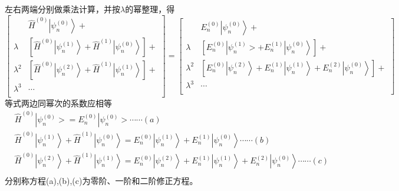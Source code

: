 \begin{frame}
  \frametitle{}
左右两端分别做乘法计算，并按$ \lambda  $的幂整理，得
\[\begin{bmatrix} ~ & \hat{H}^{(0)}\left|\psi_n^{(0)}\right\rangle + \qquad \qquad \qquad \qquad\\ 
  \lambda & \left[\hat{H}^{(0)}\left|\psi_n^{(1)}\right\rangle +\hat{H}^{(1)}\left|\psi_n^{(0)}\right\rangle\right] +  \\
  \lambda ^2  & \left[\hat{H}^{(0)}\left|\psi_n^{(2)}\right\rangle+\hat{H}^{(1)}\left|\psi_n^{(1)}\right\rangle\right]+\\
  \lambda ^3 & \cdots \\
\end{bmatrix} = 
\begin{bmatrix} ~ & E_n^{(0)}\left|\psi_n^{(0)}\right\rangle+ \qquad \qquad \qquad \qquad  \qquad \qquad \qquad \\ 
  \lambda & \left.\left[E_n^{(0)}\left|\psi_n^{(1)}>+E_n^{(1)}\right| \psi_n^{(0)}\right\rangle\right]+ \qquad  \qquad \qquad \quad\\
  \lambda ^2  & \left[E_n^{(0)}\left|\psi_n^{(2)}\right\rangle+E_n^{(1)}\left|\psi_n^{(1)}\right\rangle+E_n^{(2)}\left|\psi_n^{(0)}\right\rangle\right]+\\
  \lambda ^3 & \cdots \\
\end{bmatrix}
\]
等式两边同幂次的系数应相等
\[
  \begin{aligned}
    &\hat{H}^{(0)}\left|\psi_n^{(0)}>=E_n^{(0)}\right| \psi_n^{(0)}> \cdots\cdots (a)\\
    & \hat{H}^{(0)}\left|\psi_n^{(1)}\right\rangle+\hat{H}^{(1)}\left|\psi_n^{(0)}\right\rangle=E_n^{(0)}\left|\psi_n^{(1)}\right\rangle+E_n^{(1)}\left|\psi_n^{(0)}\right\rangle \cdots\cdots (b)\\ 
    & \hat{H}^{(0)}\left|\psi_n^{(2)}\right\rangle+\hat{H}^{(1)}\left|\psi_n^{(1)}\right\rangle=E_n^{(0)}\left|\psi_n^{(2)}\right\rangle+E_n^{(1)}\left|\psi_n^{(1)}\right\rangle+E_n^{(2)}\left|\psi_n^{(0)}\right\rangle \cdots\cdots (c)\\
  \end{aligned} 
  \]
  分别称方程(a),(b),(c)为零阶、一阶和二阶修正方程。
\end{frame}

